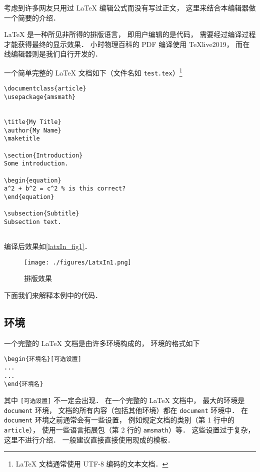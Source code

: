
考虑到许多网友只用过 LaTeX 编辑公式而没有写过正文， 这里来结合本编辑器做一个简要的介绍．

LaTeX 是一种所见非所得的排版语言， 即用户编辑的是代码， 需要经过编译过程才能获得最终的显示效果． 小时物理百科的 PDF 编译使用 TeXlive2019， 而在线编辑器则是我们自行开发的．

一个简单完整的 LaTeX 文档如下（文件名如 \lstinline|test.tex|）\footnote{LaTeX 文档通常使用 UTF-8 编码的文本文档．}
\begin{lstlisting}
\documentclass{article}
\usepackage{amsmath}


\title{My Title}
\author{My Name}
\maketitle

\section{Introduction}
Some introduction.

\begin{equation}
a^2 + b^2 = c^2 % is this correct?
\end{equation}

\subsection{Subtitle}
Subsection text.


\end{lstlisting}

编译后效果如\autoref{latxIn_fig1}．
\begin{figure}[ht]
\centering
\texttt{[image: ./figures/LatxIn1.png]}
\caption{排版效果} \label{latxIn_fig1}
\end{figure}
下面我们来解释本例中的代码．

\subsection{环境}
一个完整的 LaTeX 文档是由许多环境构成的， 环境的格式如下
\begin{lstlisting}
\begin{环境名}[可选设置]
...
...
\end{环境名}
\end{lstlisting}
其中 \lstinline|[可选设置]| 不一定会出现． 在一个完整的 LaTeX 文档中， 最大的环境是 \lstinline|document| 环境， 文档的所有内容（包括其他环境）都在 \lstinline|document| 环境中． 在 \lstinline|document| 环境之前通常会有一些设置， 例如规定文档的类别（第 1 行中的 \lstinline|article|）， 使用一些语言拓展包（第 2 行的 \lstinline|amsmath|）等． 这些设置过于复杂， 这里不进行介绍． 一般建议直接直接使用现成的模板．

